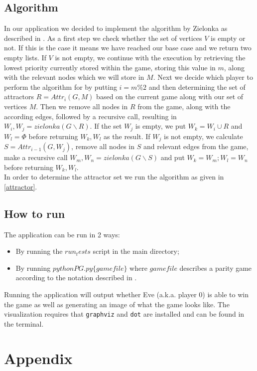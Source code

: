 \documentclass[12pt]{article}
\begin{document}
\subsection{Algorithm}
In our application we decided to implement the algorithm by Zielonka as described in \cite[~p28]{zielonka}. As a first step we check whether the set of vertices $V$ is empty or not. If this is the case it means we have reached our base case and we return two empty lists. If $V$ is not empty, we continue with the execution by retrieving the lowest priority currently stored within the game, storing this value in $m$, along with the relevant nodes which we will store in $M$. Next we decide which player to perform the algorithm for by putting $i = m\%2$ and then determining the set of attractors $R = Attr_i(G, M)$ based on the current game along with our set of vertices $M$. Then we remove all nodes in $R$ from the game, along with the according edges, followed by a recursive call, resulting in $W_i, W_j = zielonka(G \backslash R)$. If the set $W_j$ is empty, we put $W_k = W_i \cup R$ and $W_l = \Phi$ before returning $W_k, W_l$ as the result. If $W_j$ is not empty, we calculate $S = Attr_{i-1}(G, W_j)$, remove all nodes in $S$ and relevant edges from the game, make a recursive call $W_m, W_n = zielonka(G\backslash S)$ and put $W_k = W_m; W_l = W_n$ before returning $W_k, W_l$.\\
In order to determine the attractor set we run the algorithm as given in \ref{attractor}.


\subsection{How to run}
The application can be run in 2 ways:
\begin{itemize}
	\item By running the \texttt{$run_tests$} script in the main directory;
	\item By running \texttt{$python PG.py \{gamefile\}$} where $gamefile$ describes a parity game according to the notation described in \cite[~p32]{format}.
\end{itemize}
Running the application will output whether Eve (a.k.a. player 0) is able to win the game as well as generating an image of what the game looks like. The visualization requires that \texttt{graphviz} and \texttt{dot} are installed and can be found in the terminal.
\newpage

\section{Appendix}
\end{document}
